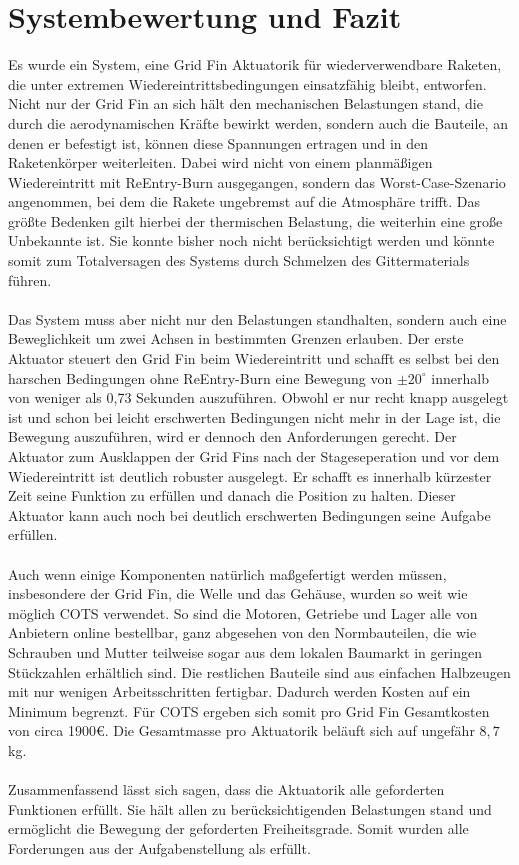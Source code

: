 \section{Systembewertung und Fazit}
Es wurde ein System, eine Grid Fin Aktuatorik für wiederverwendbare Raketen, die unter extremen Wiedereintrittsbedingungen einsatzfähig bleibt, entworfen. Nicht nur der Grid Fin an sich hält den mechanischen Belastungen stand, die durch die aerodynamischen Kräfte bewirkt werden, sondern auch die Bauteile, an denen er befestigt ist, können diese Spannungen ertragen und in den Raketenkörper weiterleiten. Dabei wird nicht von einem planmäßigen Wiedereintritt mit ReEntry-Burn ausgegangen, sondern das Worst-Case-Szenario angenommen, bei dem die Rakete ungebremst auf die Atmosphäre trifft. Das größte Bedenken gilt hierbei der thermischen Belastung, die weiterhin eine große Unbekannte ist. Sie konnte bisher noch nicht berücksichtigt werden und könnte somit zum Totalversagen des Systems durch Schmelzen des Gittermaterials führen.
\\~\\
Das System muss aber nicht nur den Belastungen standhalten, sondern auch eine Beweglichkeit um zwei Achsen in bestimmten Grenzen erlauben. Der erste Aktuator steuert den Grid Fin beim Wiedereintritt und schafft es selbst bei den harschen Bedingungen ohne ReEntry-Burn eine Bewegung von $\pm 20^\circ$  innerhalb von weniger als 0,73 Sekunden auszuführen. Obwohl er nur recht knapp ausgelegt ist und schon bei leicht erschwerten Bedingungen nicht mehr in der Lage ist, die Bewegung auszuführen, wird er dennoch den Anforderungen gerecht. Der Aktuator zum Ausklappen der Grid Fins nach der Stageseperation und vor dem Wiedereintritt ist deutlich robuster ausgelegt. Er schafft es innerhalb kürzester Zeit seine Funktion zu erfüllen und danach die Position zu halten. Dieser Aktuator kann auch noch bei deutlich erschwerten Bedingungen seine Aufgabe erfüllen.
\\~\\
Auch wenn einige Komponenten natürlich maßgefertigt werden müssen, insbesondere der Grid Fin, die Welle und das Gehäuse, wurden so weit wie möglich COTS verwendet. So sind die Motoren, Getriebe und Lager alle von Anbietern online bestellbar, ganz abgesehen von den Normbauteilen, die wie Schrauben und Mutter teilweise sogar aus dem lokalen Baumarkt in geringen Stückzahlen erhältlich sind. Die restlichen Bauteile sind aus einfachen Halbzeugen mit nur wenigen Arbeitsschritten fertigbar. Dadurch werden Kosten auf ein Minimum begrenzt. Für COTS ergeben sich somit pro Grid Fin Gesamtkosten von circa 1900€. Die Gesamtmasse pro Aktuatorik beläuft sich auf ungefähr $8,7$kg.
\\~\\
Zusammenfassend lässt sich sagen, dass die Aktuatorik alle geforderten Funktionen erfüllt. Sie hält allen zu berücksichtigenden Belastungen stand und ermöglicht die Bewegung der geforderten Freiheitsgrade. Somit wurden alle Forderungen aus der Aufgabenstellung als erfüllt.
